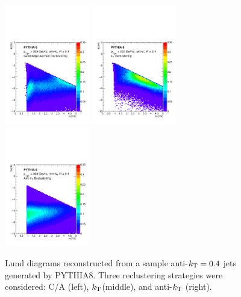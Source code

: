 \begin{figure}[t!]
\centering
\includegraphics[width=0.33\textwidth]{figures/LundMC/FinalPlots/Pythia_CA.pdf}%
\includegraphics[width=0.33\textwidth]{figures/LundMC/FinalPlots/Pythia_kt.pdf}%
\includegraphics[width=0.33\textwidth]{figures/LundMC/FinalPlots/Pythia_Akt.pdf}%
\caption{Lund diagrams reconstructed from a sample anti-$k_{\rm \tiny T} = 0.4$ jets generated by PYTHIA8. Three reclustering strategies were considered: C/A (left), $k_{\rm \tiny T}$(middle), and anti-$k_{\rm \tiny T}$ (right).}
\label{fig:PS2Vac}
\end{figure}
